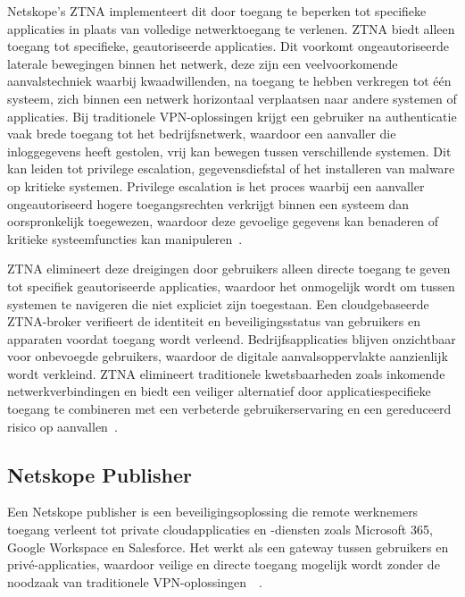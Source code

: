 \vspace{2ex}

Netskope’s ZTNA implementeert dit door toegang te beperken tot specifieke applicaties in plaats van volledige netwerktoegang te verlenen. ZTNA biedt alleen toegang tot specifieke, geautoriseerde applicaties. Dit voorkomt ongeautoriseerde laterale bewegingen binnen het netwerk, deze zijn een veelvoorkomende aanvalstechniek waarbij kwaadwillenden, na toegang te hebben verkregen tot één systeem, zich binnen een netwerk horizontaal verplaatsen naar andere systemen of applicaties. Bij traditionele VPN-oplossingen krijgt een gebruiker na authenticatie vaak brede toegang tot het bedrijfsnetwerk, waardoor een aanvaller die inloggegevens heeft gestolen, vrij kan bewegen tussen verschillende systemen. Dit kan leiden tot privilege escalation, gegevensdiefstal of het installeren van malware op kritieke systemen. Privilege escalation is het proces waarbij een aanvaller ongeautoriseerd hogere toegangsrechten verkrijgt binnen een systeem dan oorspronkelijk toegewezen, waardoor deze gevoelige gegevens kan benaderen of kritieke systeemfuncties kan manipuleren~\autocite{Netskope2025-5}. 

\vspace{2ex}

ZTNA elimineert deze dreigingen door gebruikers alleen directe toegang te geven tot specifiek geautoriseerde applicaties, waardoor het onmogelijk wordt om tussen systemen te navigeren die niet expliciet zijn toegestaan. Een cloudgebaseerde ZTNA-broker verifieert de identiteit en beveiligingsstatus van gebruikers en apparaten voordat toegang wordt verleend. Bedrijfsapplicaties blijven onzichtbaar voor onbevoegde gebruikers, waardoor de digitale aanvalsoppervlakte aanzienlijk wordt verkleind. ZTNA elimineert traditionele kwetsbaarheden zoals inkomende netwerkverbindingen en biedt een veiliger alternatief door applicatiespecifieke toegang te combineren met een verbeterde gebruikerservaring en een gereduceerd risico op aanvallen~\autocite{Netskope2025-5}.

\subsection{Netskope Publisher}
Een Netskope publisher is een beveiligingsoplossing die remote werknemers toegang verleent tot private cloudapplicaties en -diensten zoals Microsoft 365, Google Workspace en Salesforce. Het werkt als een gateway tussen gebruikers en privé-applicaties, waardoor veilige en directe toegang mogelijk wordt zonder de noodzaak van traditionele VPN-oplossingen~\autocite{Netskope2025-6}~\autocite{Netskope2025-7}.

